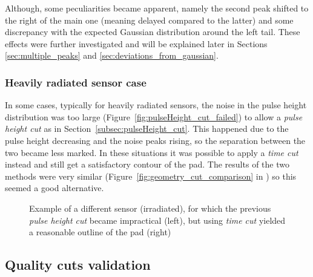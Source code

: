 Although, some peculiarities became apparent, namely the second peak shifted to the right of the main one (meaning delayed compared to the latter) and some discrepancy with the expected Gaussian distribution around the left tail. These effects were further investigated and will be explained later in Sections \ref{sec:multiple_peaks} and \ref{sec:deviations_from_gaussian}.

\subsubsection{Heavily radiated sensor case}\label{subsec:geometry_cut_w/pulse_cut}

In some cases, typically for heavily radiated sensors, the noise in the pulse height distribution was too large (Figure~\ref{fig:pulseHeight_cut_failed}) to allow a \textit{pulse height cut} as in Section~\ref{subsec:pulseHeight_cut}. This happened due to the pulse height decreasing and the noise peaks rising, so the separation between the two became less marked. In these situations it was possible to apply a \textit{time cut} instead and still get a satisfactory contour of the pad. The results of the two methods were very similar (Figure~\ref{fig:geometry_cut_comparison} in ) so this seemed a good alternative.

\begin{figure}[h!tbp]
    \centering
    \hfill
    \centering
    \captionsetup{width=\captionwidth}
    \caption{Example of a different sensor (irradiated), for which the previous \textit{pulse height cut} became impractical (left), but using \textit{time cut} yielded a reasonable outline of the pad (right)}
\end{figure}

\subsection{Quality cuts validation}

